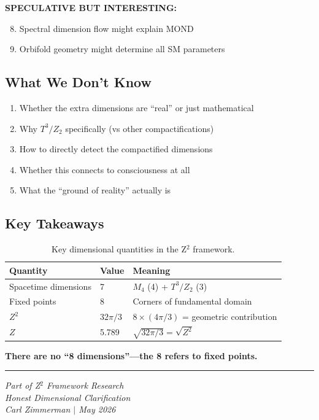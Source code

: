 \documentclass[12pt,a4paper]{article}
\begin{document}
\textbf{SPECULATIVE BUT INTERESTING:}
\begin{enumerate}
\setcounter{enumi}{7}
\item Spectral dimension flow might explain MOND
\item Orbifold geometry might determine all SM parameters
\end{enumerate}

\subsection{What We Don't Know}

\begin{enumerate}
\item Whether the extra dimensions are ``real'' or just mathematical
\item Why $T^3/Z_2$ specifically (vs other compactifications)
\item How to directly detect the compactified dimensions
\item Whether this connects to consciousness at all
\item What the ``ground of reality'' actually is
\end{enumerate}

\subsection{Key Takeaways}

\begin{table}[h]
\centering
\begin{tabular}{@{}lll@{}}
\toprule
Quantity & Value & Meaning \\
\midrule
Spacetime dimensions & 7 & $M_4$ (4) + $T^3/Z_2$ (3) \\
Fixed points & 8 & Corners of fundamental domain \\
$Z^2$ & $32\pi/3$ & $8 \times (4\pi/3)$ = geometric contribution \\
$Z$ & 5.789 & $\sqrt{32\pi/3} = \sqrt{Z^2}$ \\
\bottomrule
\end{tabular}
\caption{Key dimensional quantities in the Z$^2$ framework.}
\end{table}

\textbf{There are no ``8 dimensions''---the 8 refers to fixed points.}

\vspace{1cm}
\hrule
\vspace{0.5cm}
\textit{Part of Z$^2$ Framework Research}\\
\textit{Honest Dimensional Clarification}\\
\textit{Carl Zimmerman $|$ May 2026}
\end{document}
